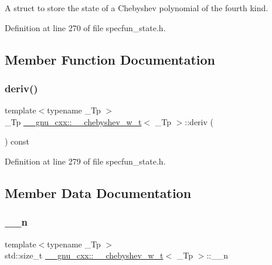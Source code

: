 A struct to store the state of a Chebyshev polynomial of the fourth kind. 

Definition at line 270 of file specfun\+\_\+state.\+h.



\subsection{Member Function Documentation}
\mbox{\label{struct____gnu__cxx_1_1____chebyshev__w__t_a12989ea093bebe65f3d35dbfe3a6dc92}} 
\subsubsection{\texorpdfstring{deriv()}{deriv()}}
{\footnotesize\ttfamily template$<$typename \+\_\+\+Tp $>$ \\
\+\_\+\+Tp \hyperlink{struct____gnu__cxx_1_1____chebyshev__w__t}{\+\_\+\+\_\+gnu\+\_\+cxx\+::\+\_\+\+\_\+chebyshev\+\_\+w\+\_\+t}$<$ \+\_\+\+Tp $>$\+::deriv (\begin{DoxyParamCaption}{ }\end{DoxyParamCaption}) const\hspace{0.3cm}{\ttfamily [inline]}}



Definition at line 279 of file specfun\+\_\+state.\+h.



\subsection{Member Data Documentation}
\mbox{\label{struct____gnu__cxx_1_1____chebyshev__w__t_afce623f28d0c2e7fd6bb89d03e0fc645}} 
\subsubsection{\texorpdfstring{\+\_\+\+\_\+n}{\_\_n}}
{\footnotesize\ttfamily template$<$typename \+\_\+\+Tp $>$ \\
std\+::size\+\_\+t \hyperlink{struct____gnu__cxx_1_1____chebyshev__w__t}{\+\_\+\+\_\+gnu\+\_\+cxx\+::\+\_\+\+\_\+chebyshev\+\_\+w\+\_\+t}$<$ \+\_\+\+Tp $>$\+::\+\_\+\+\_\+n}



